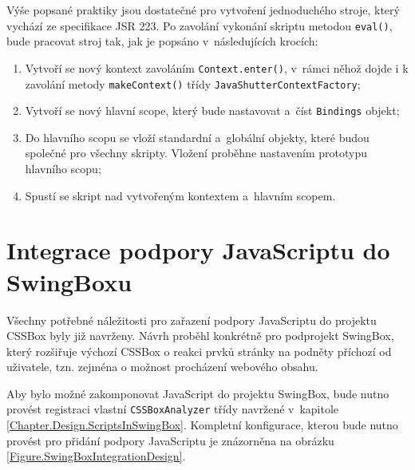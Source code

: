 Výše popsané praktiky jsou dostatečné pro vytvoření jednoduchého stroje, který vychází ze specifikace JSR 223.  Po zavolání vykonání skriptu metodou \texttt{eval()}, bude pracovat stroj tak, jak je popsáno v~následujících krocích:  

\begin{enumerate}
  \item	Vytvoří se nový kontext zavoláním \texttt{Context.enter()}, v~rámci něhož dojde i k zavolání metody \texttt{makeContext()} třídy \texttt{JavaShutterContextFactory};
  \item	Vytvoří se nový hlavní scope, který bude nastavovat a~číst \texttt{Bindings} objekt;
  \item	Do hlavního scopu se vloží standardní a~globální objekty, které budou společné pro všechny skripty. Vložení proběhne nastavením prototypu hlavního scopu;
  \item	Spustí se skript nad vytvořeným kontextem a~hlavním scopem.
\end{enumerate}

\section{Integrace podpory JavaScriptu do SwingBoxu}
\label{Chapter.Design.SwingBoxIntegration}

Všechny potřebné náležitosti pro zařazení podpory JavaScriptu do projektu CSSBox byly již navrženy. Návrh proběhl konkrétně pro podprojekt SwingBox, který rozšiřuje výchozí  CSSBox o reakci prvků stránky na podněty příchozí od uživatele, tzn. zejména o možnost procházení webového obsahu. 

Aby bylo možné zakomponovat JavaScript do projektu SwingBox, bude nutno provést registraci vlastní \texttt{CSSBoxAnalyzer} třídy navržené v~kapitole \ref{Chapter.Design.ScriptsInSwingBox}. Kompletní konfigurace, kterou bude nutno provést pro přidání podpory JavaScriptu je znázorněna na obrázku \ref{Figure.SwingBoxIntegrationDesign}.

